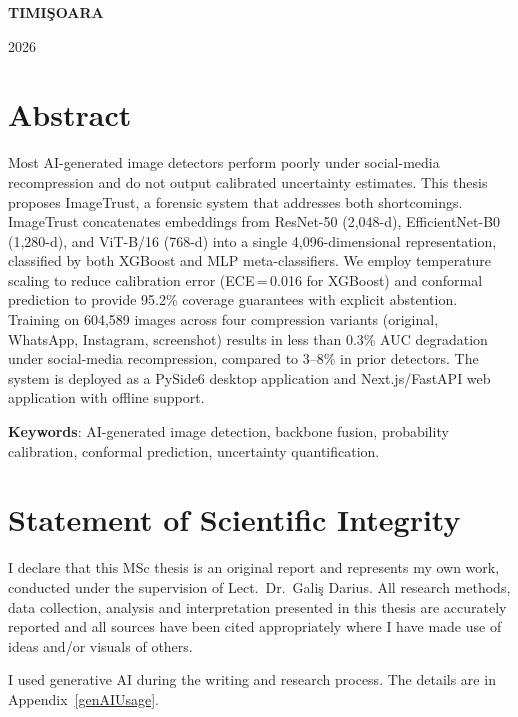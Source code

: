 \documentclass[12pt,a4paper]{book}
\theoremstyle{definition}
\theoremstyle{remark}
\begin{document}
\vfill
\begin{center}
{\bf TIMI\c SOARA

2026}
\end{center}

\newpage
\normalsize{}

\section*{Abstract}
Most AI-generated image detectors perform poorly under social-media recompression and do not output calibrated uncertainty estimates. This thesis proposes ImageTrust, a forensic system that addresses both shortcomings. ImageTrust concatenates embeddings from ResNet-50 (2,048-d), EfficientNet-B0 (1,280-d), and ViT-B/16 (768-d) into a single 4,096-dimensional representation, classified by both XGBoost and MLP meta-classifiers. We employ temperature scaling to reduce calibration error (ECE\,=\,0.016 for XGBoost) and conformal prediction to provide 95.2\% coverage guarantees with explicit abstention. Training on 604,589 images across four compression variants (original, WhatsApp, Instagram, screenshot) results in less than 0.3\% AUC degradation under social-media recompression, compared to 3--8\% in prior detectors. The system is deployed as a PySide6 desktop application and Next.js/FastAPI web application with offline support.

\noindent\textbf{Keywords}: AI-generated image detection, backbone fusion, probability calibration, conformal prediction, uncertainty quantification.

\newpage
\section*{Statement of Scientific Integrity}
I declare that this MSc thesis is an original report and represents my own work, conducted under the supervision of Lect.\ Dr.\ Gali\c{s} Darius. All research methods, data collection, analysis and interpretation presented in this thesis are accurately reported and all sources have been cited appropriately where I have made use of ideas and/or visuals of others.

I used generative AI during the writing and research process. The details are in Appendix~\ref{genAIUsage}.
\end{document}

